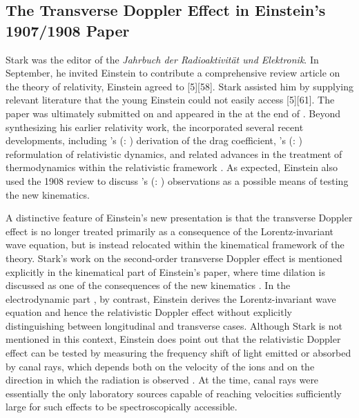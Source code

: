 \documentclass[pdflatex,sn-basic]{sn-jnl}
\newcommand{\TDE}{Transverse Doppler Effect\xspace}
\renewcommand{\citets}[2][]{\citeauthor{#2}'s (\citeyear{#2}\if\relax\detokenize{#1}\relax\else: #1\fi)}
\begin{document}
\subsection{The \TDE{} in Einstein’s 1907/1908  Paper}
%
Stark was the editor of the \emph{Jahrbuch der Radioaktivität und Elektronik}. In September, he invited Einstein to contribute a comprehensive review article on the theory of relativity, Einstein agreed to  [5][58]. Stark assisted him by supplying relevant literature that the young Einstein could not easily access [5][61]. The paper  was ultimately submitted on  and appeared in the  at the end of . Beyond synthesizing his earlier relativity work, the \citet{Einstein1908} incorporated several recent developments, including \citets{Laue1907} derivation of the drag coefficient, \citets{Planck1906a} reformulation of relativistic dynamics, and related advances in the treatment of thermodynamics within the relativistic framework \citep{Planck1907}. As expected, Einstein also used the 1908 review to discuss \citets{Stark1906} observations as a possible means of testing the new kinematics.

A distinctive feature of Einstein’s new presentation is that the transverse Doppler effect is no longer treated primarily as a consequence of the Lorentz-invariant wave equation, but is instead relocated within the kinematical framework of the theory. Stark’s work on the second-order transverse Doppler effect is mentioned explicitly in the kinematical part  of Einstein’s paper, where time dilation is discussed as one of the consequences of the new kinematics \citep[422]{Einstein1908}. In the electrodynamic part , by contrast, Einstein derives the Lorentz-invariant wave equation and hence the relativistic Doppler effect without explicitly distinguishing between longitudinal and transverse cases. Although Stark is not mentioned in this context, Einstein does point out that the relativistic Doppler effect can be tested by measuring the frequency shift of light emitted or absorbed by canal rays, which depends both on the velocity of the ions and on the direction in which the radiation is observed \citep[425]{Einstein1907a}. At the time, canal rays were essentially the only laboratory sources capable of reaching velocities sufficiently large for such effects to be spectroscopically accessible.

\end{document}
